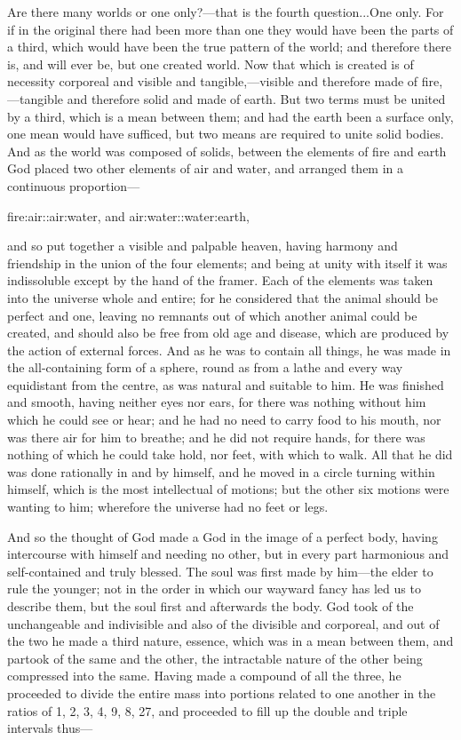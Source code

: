 \documentclass[11pt,letter]{article}
\begin{document}
\par  Are there many worlds or one only?—that is the fourth question...One only. For if in the original there had been more than one they would have been the parts of a third, which would have been the true pattern of the world; and therefore there is, and will ever be, but one created world. Now that which is created is of necessity corporeal and visible and tangible,—visible and therefore made of fire,—tangible and therefore solid and made of earth. But two terms must be united by a third, which is a mean between them; and had the earth been a surface only, one mean would have sufficed, but two means are required to unite solid bodies. And as the world was composed of solids, between the elements of fire and earth God placed two other elements of air and water, and arranged them in a continuous proportion—

\par  fire:air::air:water, and air:water::water:earth,

\par  and so put together a visible and palpable heaven, having harmony and friendship in the union of the four elements; and being at unity with itself it was indissoluble except by the hand of the framer. Each of the elements was taken into the universe whole and entire; for he considered that the animal should be perfect and one, leaving no remnants out of which another animal could be created, and should also be free from old age and disease, which are produced by the action of external forces. And as he was to contain all things, he was made in the all-containing form of a sphere, round as from a lathe and every way equidistant from the centre, as was natural and suitable to him. He was finished and smooth, having neither eyes nor ears, for there was nothing without him which he could see or hear; and he had no need to carry food to his mouth, nor was there air for him to breathe; and he did not require hands, for there was nothing of which he could take hold, nor feet, with which to walk. All that he did was done rationally in and by himself, and he moved in a circle turning within himself, which is the most intellectual of motions; but the other six motions were wanting to him; wherefore the universe had no feet or legs.

\par  And so the thought of God made a God in the image of a perfect body, having intercourse with himself and needing no other, but in every part harmonious and self-contained and truly blessed. The soul was first made by him—the elder to rule the younger; not in the order in which our wayward fancy has led us to describe them, but the soul first and afterwards the body. God took of the unchangeable and indivisible and also of the divisible and corporeal, and out of the two he made a third nature, essence, which was in a mean between them, and partook of the same and the other, the intractable nature of the other being compressed into the same. Having made a compound of all the three, he proceeded to divide the entire mass into portions related to one another in the ratios of 1, 2, 3, 4, 9, 8, 27, and proceeded to fill up the double and triple intervals thus—
 
\end{document}
